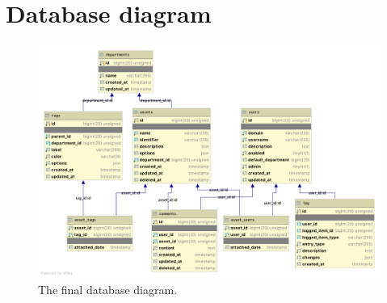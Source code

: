 \chapter{Database diagram} \label{app:database_diagram}

\begin{figure}[H]
    \centering
    \includegraphics[width=1.06\textwidth, angle=90]{figures/db-diagram.png}
    \caption{The final database diagram.}
    \label{fig:db-diagram}
\end{figure}